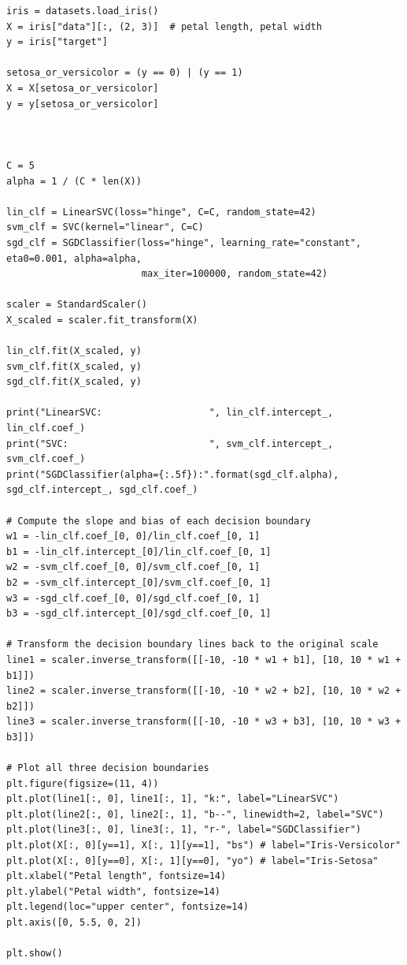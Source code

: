\documentclass{beamer}
\begin{document}
\begin{frame}
\begin{lstlisting}
iris = datasets.load_iris()
X = iris["data"][:, (2, 3)]  # petal length, petal width
y = iris["target"]

setosa_or_versicolor = (y == 0) | (y == 1)
X = X[setosa_or_versicolor]
y = y[setosa_or_versicolor]



C = 5
alpha = 1 / (C * len(X))

lin_clf = LinearSVC(loss="hinge", C=C, random_state=42)
svm_clf = SVC(kernel="linear", C=C)
sgd_clf = SGDClassifier(loss="hinge", learning_rate="constant", eta0=0.001, alpha=alpha,
                        max_iter=100000, random_state=42)

scaler = StandardScaler()
X_scaled = scaler.fit_transform(X)

lin_clf.fit(X_scaled, y)
svm_clf.fit(X_scaled, y)
sgd_clf.fit(X_scaled, y)

print("LinearSVC:                   ", lin_clf.intercept_, lin_clf.coef_)
print("SVC:                         ", svm_clf.intercept_, svm_clf.coef_)
print("SGDClassifier(alpha={:.5f}):".format(sgd_clf.alpha), sgd_clf.intercept_, sgd_clf.coef_)

# Compute the slope and bias of each decision boundary
w1 = -lin_clf.coef_[0, 0]/lin_clf.coef_[0, 1]
b1 = -lin_clf.intercept_[0]/lin_clf.coef_[0, 1]
w2 = -svm_clf.coef_[0, 0]/svm_clf.coef_[0, 1]
b2 = -svm_clf.intercept_[0]/svm_clf.coef_[0, 1]
w3 = -sgd_clf.coef_[0, 0]/sgd_clf.coef_[0, 1]
b3 = -sgd_clf.intercept_[0]/sgd_clf.coef_[0, 1]

# Transform the decision boundary lines back to the original scale
line1 = scaler.inverse_transform([[-10, -10 * w1 + b1], [10, 10 * w1 + b1]])
line2 = scaler.inverse_transform([[-10, -10 * w2 + b2], [10, 10 * w2 + b2]])
line3 = scaler.inverse_transform([[-10, -10 * w3 + b3], [10, 10 * w3 + b3]])

# Plot all three decision boundaries
plt.figure(figsize=(11, 4))
plt.plot(line1[:, 0], line1[:, 1], "k:", label="LinearSVC")
plt.plot(line2[:, 0], line2[:, 1], "b--", linewidth=2, label="SVC")
plt.plot(line3[:, 0], line3[:, 1], "r-", label="SGDClassifier")
plt.plot(X[:, 0][y==1], X[:, 1][y==1], "bs") # label="Iris-Versicolor"
plt.plot(X[:, 0][y==0], X[:, 1][y==0], "yo") # label="Iris-Setosa"
plt.xlabel("Petal length", fontsize=14)
plt.ylabel("Petal width", fontsize=14)
plt.legend(loc="upper center", fontsize=14)
plt.axis([0, 5.5, 0, 2])

plt.show()




\end{lstlisting}
\end{frame}
\end{document}

